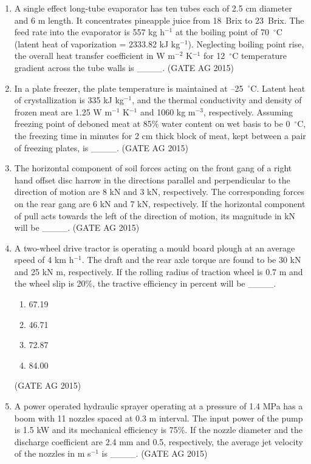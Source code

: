 \documentclass[journal,12pt,onecolumn]{IEEEtran}
\theoremstyle{remark}
\begin{document}
\begin{enumerate}
\item 
A single effect long-tube evaporator has ten tubes each of 2.5 cm diameter and 6 m length. It concentrates pineapple juice from 18~Brix to 23~Brix. The feed rate into the evaporator is 557 kg h$^{-1}$ at the boiling point of 70~$^\circ$C (latent heat of vaporization = 2333.82 kJ kg$^{-1}$). Neglecting boiling point rise, the overall heat transfer coefficient in W m$^{-2}$ K$^{-1}$ for 12~$^\circ$C temperature gradient across the tube walls is \_\_\_\_.  
\hfill{(GATE AG 2015)}

\item 
In a plate freezer, the plate temperature is maintained at --25~$^\circ$C. Latent heat of crystallization is 335 kJ kg$^{-1}$, and the thermal conductivity and density of frozen meat are 1.25 W m$^{-1}$ K$^{-1}$ and 1060 kg m$^{-3}$, respectively. Assuming freezing point of deboned meat at 85\% water content on wet basis to be 0~$^\circ$C, the freezing time in minutes for 2 cm thick block of meat, kept between a pair of freezing plates, is \_\_\_\_.  
\hfill{(GATE AG 2015)}

\item 
The horizontal component of soil forces acting on the front gang of a right hand offset disc harrow in the directions parallel and perpendicular to the direction of motion are 8 kN and 3 kN, respectively. The corresponding forces on the rear gang are 6 kN and 7 kN, respectively. If the horizontal component of pull acts towards the left of the direction of motion, its magnitude in kN will be \_\_\_\_.  
\hfill{(GATE AG 2015)}

\item 
A two-wheel drive tractor is operating a mould board plough at an average speed of 4 km h$^{-1}$. The draft and the rear axle torque are found to be 30 kN and 25 kN m, respectively. If the rolling radius of traction wheel is 0.7 m and the wheel slip is 20\%, the tractive efficiency in percent will be \_\_\_\_.  
\begin{multicols}{4}
\begin{enumerate}
    \item 67.19  
    \item 46.71  
    \item 72.87  
    \item 84.00  
\end{enumerate}
\end{multicols}
\hfill{(GATE AG 2015)}

\item 
A power operated hydraulic sprayer operating at a pressure of 1.4 MPa has a boom with 11 nozzles spaced at 0.3 m interval. The input power of the pump is 1.5 kW and its mechanical efficiency is 75\%. If the nozzle diameter and the discharge coefficient are 2.4 mm and 0.5, respectively, the average jet velocity of the nozzles in m s$^{-1}$ is \_\_\_\_.  
\hfill{(GATE AG 2015)}


\end{enumerate}
\end{document}
